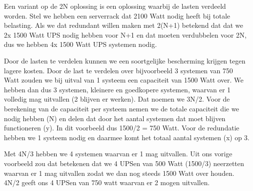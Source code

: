 Een variant op de 2N oplossing is een oplossing waarbij de lasten verdeeld worden. Stel we hebben een serverrack dat 2100 Watt nodig heeft bij totale belasting. Als we dat redundant willen maken met 2(N+1) betekend dat dat we 2x 1500 Watt UPS nodig hebben voor N+1 en dat moeten verdubbelen voor 2N, dus we hebben 4x 1500 Watt UPS systemen nodig.

Door de lasten te verdelen kunnen we een soortgelijke bescherming krijgen tegen lagere kosten. Door de last te verdelen over bijvoorbeeld 3 systemen van 750 Watt zouden we bij uitval van 1 systeem een capaciteit van 1500 Watt over. We hebben dan dus 3 systemen, kleinere en goedkopere systemen, waarvan er 1 volledig mag uitvallen (2 blijven er werken). Dat noemen we 3N/2. Voor de berekening van de capaciteit per systeem nemen we de totale capaciteit die we nodig hebben (N) en delen dat door het aantal systemen dat moet blijven functioneren (y). In dit voorbeeld dus 1500/2 = 750 Watt. Voor de redundatie hebben we 1 systeem nodig en daarmee komt het totaal aantal systemen (x) op 3.

Met 4N/3 hebben we 4 systemen waarvan er 1 mag uitvallen. Uit ons vorige voorbeeld zou dat betekenen dat we 4 UPSen van 500 Watt (1500/3) neerzetten waarvan er 1 mag uitvallen zodat we dan nog steeds 1500 Watt over houden. 4N/2 geeft ons 4 UPSen van 750 watt waarvan er 2 mogen uitvallen.
